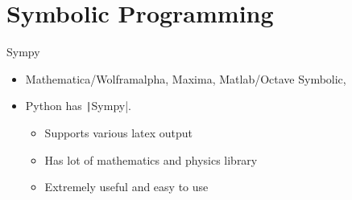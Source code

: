 \documentclass[aspectratio=169]{beamer}
\newcommand{\code}[2][python]{\texttt|#2|}
\begin{document}
\section{Symbolic Programming}
%
\begin{frame}[fragile]{Sympy}
    \begin{itemize}
        \item Mathematica/Wolframalpha, Maxima, Matlab/Octave Symbolic, 
        \item Python has \code{Sympy}.
            \begin{itemize}
                \item Supports various latex output
                \item Has lot of mathematics and physics library
                \item Extremely useful and easy to use
            \end{itemize}
    \end{itemize}
\end{frame} 
%
%
%
\end{document}

